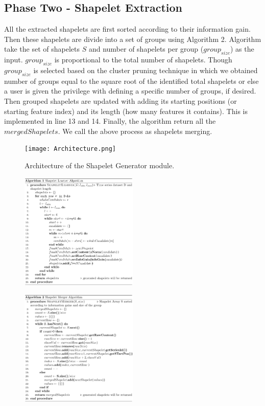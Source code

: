 \documentclass[conference]{IEEEtran}  %
\begin{document}
\subsection{Phase Two - Shapelet Extraction}
All the extracted shapelets are first sorted according to their information gain. Then these shapelets are divide into a set of groups using Algorithm 2. Algorithm take the set of shapelets $S$ and number of shapelets per group ($group_{size}$) as the input. $group_{size}$ is proportional to the total number of shapelets. Though $group_{size}$ is selected based on the cluster pruning technique in which we obtained number of groups equal to the square root of the identified total shapelets or else a user is given the privilege with defining a specific number of groups, if desired. Then grouped shapelets are updated with adding its starting positions (or starting feature index) and its length (how many features it contains). This is implemented in line 13 and 14. Finally, the algorithm return all the $mergedShapelets$. We call the above process as shapelets merging.

\begin{figure}
\texttt{[image: Architecture.png]}
\caption{Architecture of the Shapelet Generator module.}
\label{fig:hintgen}
\end{figure}

\begin{figure}
\includegraphics[width=0.5\textwidth]{algo1.png}\squeezeup\squeezeup\squeezeup
\end{figure}
\begin{figure}
\includegraphics[width=0.5\textwidth]{algo2.png}\squeezeup\squeezeup\squeezeup
\end{figure}
\end{document}
